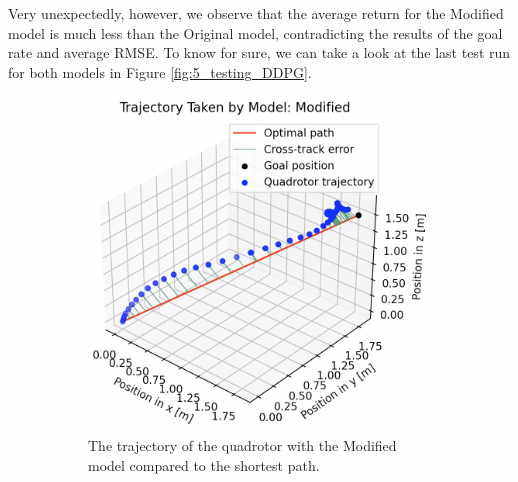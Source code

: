 Very unexpectedly, however, we observe that the average return for the Modified model is much less than the Original model, contradicting the results of the goal rate and average RMSE. To know for sure, we can take a look at the last test run for both models in Figure \ref{fig:5_testing_DDPG}.
\begin{figure}[H]
     \centering
     \begin{subfigure}[b]{0.51\textwidth}
         \centering
         \captionsetup{justification=centering}
         \includegraphics[width=\textwidth]{figures/5_/Testing/ddpg_test_modified1.png}
         \caption{The trajectory of the quadrotor with the Modified model compared to the shortest path.}
         \label{fig:testing_ddpgModified1}
     \end{subfigure} 
     \hfill 
     \begin{subfigure}[b]{0.48\textwidth}
         \centering
         \captionsetup{justification=centering}

\end{subfigure}
\end{figure}
